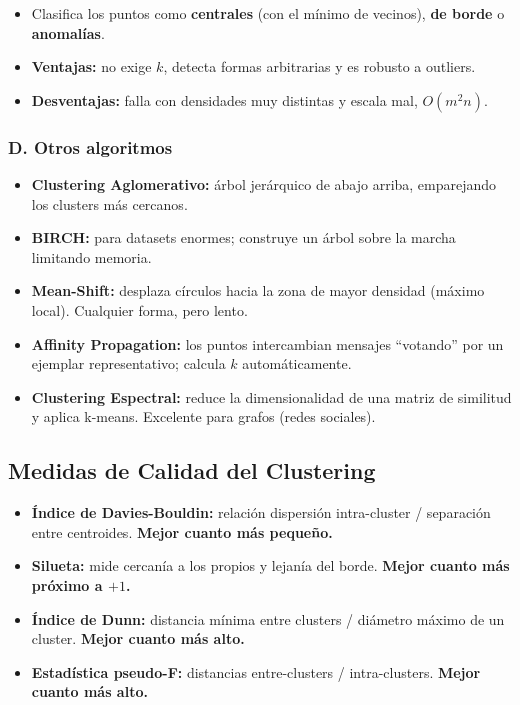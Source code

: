 \documentclass[12pt]{book} %
\providecommand{\tightlist}{%
  \setlength{\itemsep}{0pt}\setlength{\parskip}{0pt}}
\begin{document}
\begin{itemize}
\tightlist
\item
  Clasifica los puntos como \textbf{centrales} (con el mínimo de
  vecinos), \textbf{de borde} o \textbf{anomalías}.
\item
  \textbf{Ventajas:} no exige \(k\), detecta formas arbitrarias y es
  robusto a outliers.
\item
  \textbf{Desventajas:} falla con densidades muy distintas y escala mal,
  \(O(m^2 n)\).
\end{itemize}

\hypertarget{d.-otros-algoritmos}{%
\subsubsection{D. Otros algoritmos}\label{d.-otros-algoritmos}}

\begin{itemize}
\tightlist
\item
  \textbf{Clustering Aglomerativo:} árbol jerárquico de abajo arriba,
  emparejando los clusters más cercanos.
\item
  \textbf{BIRCH:} para datasets enormes; construye un árbol sobre la
  marcha limitando memoria.
\item
  \textbf{Mean-Shift:} desplaza círculos hacia la zona de mayor densidad
  (máximo local). Cualquier forma, pero lento.
\item
  \textbf{Affinity Propagation:} los puntos intercambian mensajes
  ``votando'' por un ejemplar representativo; calcula \(k\)
  automáticamente.
\item
  \textbf{Clustering Espectral:} reduce la dimensionalidad de una matriz
  de similitud y aplica k-means. Excelente para grafos (redes sociales).
\end{itemize}

\hypertarget{medidas-de-calidad-del-clustering}{%
\subsection{Medidas de Calidad del
Clustering}\label{medidas-de-calidad-del-clustering}}

\begin{itemize}
\tightlist
\item
  \textbf{Índice de Davies-Bouldin:} relación dispersión intra-cluster /
  separación entre centroides. \textbf{Mejor cuanto más pequeño.}
\item
  \textbf{Silueta:} mide cercanía a los propios y lejanía del borde.
  \textbf{Mejor cuanto más próximo a \(+1\).}
\item
  \textbf{Índice de Dunn:} distancia mínima entre clusters / diámetro
  máximo de un cluster. \textbf{Mejor cuanto más alto.}
\item
  \textbf{Estadística pseudo-F:} distancias entre-clusters /
  intra-clusters. \textbf{Mejor cuanto más alto.}
\end{itemize}
\end{document}
